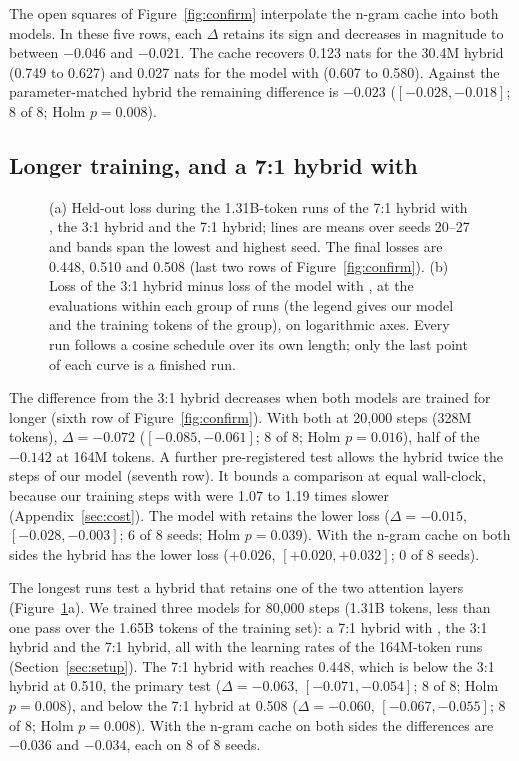 The open squares of Figure~\ref{fig:confirm} interpolate the n-gram cache into both models. In
these five rows, each $\Delta$ retains its sign and decreases in magnitude to between $-0.046$ and
$-0.021$. The cache recovers 0.123 nats for the 30.4M hybrid (0.749 to 0.627) and 0.027 nats for
the model with \ingram{} (0.607 to 0.580). Against the parameter-matched hybrid the remaining
difference is $-0.023$ ($[-0.028, -0.018]$; 8 of 8; Holm $p = 0.008$).

\subsection{Longer training, and a 7:1 hybrid with \ingram{}}
\label{sec:length}

\begin{figure}[tb]
\centering

\caption{(a) Held-out loss during the 1.31B-token runs of the 7:1 hybrid with \ingram{}, the 3:1
hybrid and the 7:1 hybrid; lines are means over seeds 20--27 and bands span the lowest and highest
seed. The final losses are 0.448, 0.510 and 0.508 (last two rows of Figure~\ref{fig:confirm}).
(b) Loss of the 3:1 hybrid minus loss of the model with \ingram{}, at the evaluations within each
group of runs (the legend gives our model and the training tokens of the group), on logarithmic
axes. Every run follows a cosine schedule over its own length; only the last point of each curve
is a finished run.}
\label{fig:training}
\end{figure}

The difference from the 3:1 hybrid decreases when both models are trained for longer (sixth row of
Figure~\ref{fig:confirm}). With both at 20,000 steps (328M tokens), $\Delta = -0.072$ ($[-0.085,
-0.061]$; 8 of 8; Holm $p = 0.016$), half of the $-0.142$ at 164M tokens. A further pre-registered
test allows the hybrid twice the steps of our model (seventh row). It bounds a comparison at equal
wall-clock, because our training steps with \ingram{} were 1.07 to 1.19 times slower
(Appendix~\ref{sec:cost}). The model with \ingram{} retains the lower loss ($\Delta = -0.015$,
$[-0.028, -0.003]$; 6 of 8 seeds; Holm $p = 0.039$). With the n-gram cache on both sides the
hybrid has the lower loss ($+0.026$, $[+0.020, +0.032]$; 0 of 8 seeds).

The longest runs test a hybrid that retains one of the two attention layers
(Figure~\ref{fig:training}a). We trained three models for 80,000 steps (1.31B tokens, less than
one pass over the 1.65B tokens of the training set): a 7:1 hybrid with \ingram{}, the 3:1 hybrid
and the 7:1 hybrid, all with the learning rates of the 164M-token runs
(Section~\ref{sec:setup}). The 7:1 hybrid with
\ingram{} reaches 0.448, which is below the 3:1 hybrid at 0.510, the primary test ($\Delta =
-0.063$, $[-0.071, -0.054]$; 8 of 8; Holm $p = 0.008$), and below the 7:1 hybrid at 0.508
($\Delta = -0.060$, $[-0.067, -0.055]$; 8 of 8; Holm $p = 0.008$). With the n-gram cache on both
sides the differences are $-0.036$ and $-0.034$, each on 8 of 8 seeds.

